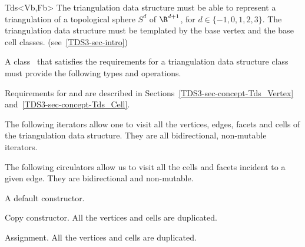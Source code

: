 \begin{ccClassTemplate}{Tds<Vb,Fb>}
The triangulation data structure must be able to represent a
triangulation of a topological sphere $S^d$ of $\R^{d+1}$, for 
$d \in \{-1,0,1,2,3\}$.
The triangulation data structure must be templated by the base
vertex and the base cell classes. 
(see~\ref{TDS3-sec-intro})


A class \ccClassTemplateName\ that satisfies the requirements for a
triangulation data structure class must provide the following types and
operations. 

\ccTypes
{}
\ccThreeToTwo

\ccGlue
{}
Requirements for  and  are described in
Sections~\ref{TDS3-sec-concept-Tds_Vertex}
and~\ref{TDS3-sec-concept-Tds_Cell}.

\ccGlue
{} 


The following iterators allow one to visit all the vertices, edges, facets
and cells of the triangulation data structure. They are all
bidirectional, non-mutable iterators.

\ccGlue
{}
\ccGlue
{}
\ccGlue
{}

The following circulators allow us to visit all the cells and facets
incident to a given edge. They are bidirectional and non-mutable.

\ccGlue
{}

\ccCreation
{}

{A default constructor.}

{Copy constructor. All the vertices and cells are duplicated.}

{Assignment. All the vertices and cells are duplicated.}


\end{ccClassTemplate}

